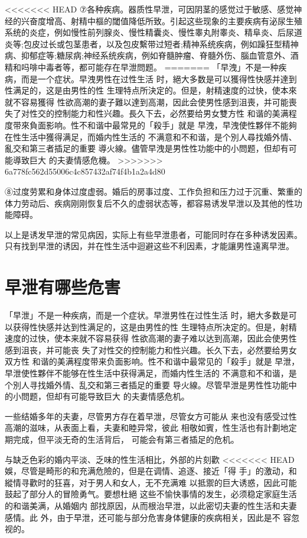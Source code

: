 \documentclass[12pt,UTF8]{ctexbook}
\begin{document}
<<<<<<< HEAD
⑦各种疾病。器质性早泄，可因阴茎的感觉过于敏感、感觉神经的兴奋度增高、射精中樞的閾值降低所致。引起这些现象的主要疾病有泌尿生殖系统的炎症，例如慢性前列腺炎、慢性精囊炎、慢性睾丸附睾炎、精阜炎、后尿道炎等;包皮过长或包茎患者，以及包皮繫带过短者;精神系统疾病，例如躁狂型精神病、抑郁症等;糖尿病;神经系统疾病，例如脊髓肿瘤、脊髓外伤、腦血管意外、酒精和吗啡中毒者等，都可能存在早泄問题。
=======
「早洩」不是一种疾病，而是一个症状。早洩男性在过性生活
时，絕大多数是可以獲得性快感并達到性满足的，这是由男性的性
生理特点所決定的。但是，射精速度的过快，使本來就不容易獲得
性欲高潮的妻子難以達到高潮，因此会使男性感到沮喪，并可能喪
失了对性交的控制能力和性兴趣。長久下去，必然要给男女雙方性
和谐的美满程度带來負面影响。性不和谐中最常見的「殺手」就是
早洩，早洩使性夥伴不能夠在性生活中獲得满足，而婚内性生活的
不满意和不和谐，是个別人尋找婚外情、亂交和第三者插足的重要
導火線。儘管早洩是男性性功能中的小問题，但却有可能導致巨大
的夫妻情感危機。
>>>>>>> 6a778fc562d55006c4c857432af74f4b1a2a4d80

⑧过度劳累和身体过度虚弱。婚后的房事过度、工作负担和压力过于沉重、繁重的体力劳动后、疾病刚刚恢复后不久的虚弱状态等，都容易诱发早泄以及其他的性功能障碍。

以上是诱发早泄的常见病因，实际上有些早泄患者，可能同时存在多种诱发因素。只有找到早泄的诱因，并在性生活中迴避这些不利因素，才能讓男性遠离早泄。

\section{早泄有哪些危害}

「早泄」不是一种疾病，而是一个症状。早泄男性在过性生活
时，絕大多数是可以获得性快感并达到性满足的，这是由男性的性
生理特点所决定的。但是，射精速度的过快，使本来就不容易获得
性欲高潮的妻子难以达到高潮，因此会使男性感到沮丧，并可能丧
失了对性交的控制能力和性兴趣。长久下去，必然要给男女双方性
和谐的美满程度带来负面影响。性不和谐中最常见的「殺手」就是
早泄，早泄使性夥伴不能够在性生活中获得满足，而婚内性生活的
不满意和不和谐，是个別人寻找婚外情、乱交和第三者插足的重要
导火線。尽管早泄是男性性功能中的小問题，但却有可能导致巨大
的夫妻情感危机。

一些结婚多年的夫妻，尽管男方存在着早泄，尽管女方可能从
来也没有感受过性高潮的滋味，从表面上看，夫妻和睦异常，彼此
相敬如賓，性生活也有計劃地定期完成，但平淡无奇的生活背后，
可能会有第三者插足的危机。

与缺乏色彩的婚内平淡、乏味的性生活相比，外部的片刻歡
<<<<<<< HEAD
娛，尽管是畸形的和充满危險的，但是在调情、追逐、接近「得
手」的激动，和縱情寻歡时的狂喜，对于男人和女人，无不充满难
以抵禦的巨大诱惑，因此可能鼓起了部分人的冒險勇气。要想杜絕
这些不愉快事情的发生，必须稳定家庭生活的和谐美满，从婚姻内
部找原因，从而根治早泄，以此密切夫妻的性生活和夫妻感情。此
外，由于早泄，还可能与部分危害身体健康的疾病相关，因此是不
容忽视的。
\end{document}
